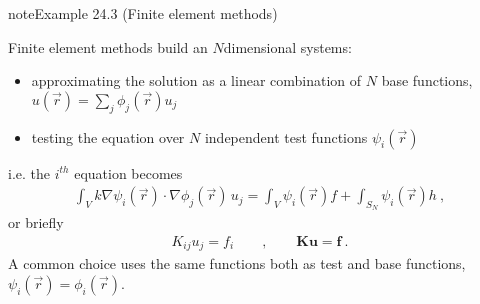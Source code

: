 \documentclass[letterpaper,10pt,english]{jupyterBook}
\begin{document}
\begin{sphinxadmonition}{note}{Example 24.3 (Finite element methods)}



\sphinxAtStartPar
Finite element methods build an \(N\)\sphinxhyphen{}dimensional systems:
\begin{itemize}
\item {} 
\sphinxAtStartPar
approximating the solution as a linear combination of \(N\) base functions, \(u(\vec{r}) = \sum_j \phi_j(\vec{r}) u_j\)

\item {} 
\sphinxAtStartPar
testing the equation over \(N\) independent test functions \(\psi_i(\vec{r})\)

\end{itemize}

\sphinxAtStartPar
i.e. the \(i^{th}\) equation becomes
\begin{equation*}
\begin{split}\int_{V} k \nabla \psi_i(\vec{r}) \cdot \nabla \phi_j(\vec{r}) \, u_j = \int_{V} \psi_i(\vec{r}) f + \int_{S_N} \psi_i(\vec{r}) h \ ,\end{split}
\end{equation*}
\sphinxAtStartPar
or briefly
\begin{equation*}
\begin{split}K_{ij} u_j = f_i \qquad , \qquad \mathbf{K} \mathbf{u} = \mathbf{f} \ .\end{split}
\end{equation*}
\sphinxAtStartPar
A common choice uses the same functions both as test and base functions, \(\psi_i(\vec{r}) = \phi_i(\vec{r})\).
\end{sphinxadmonition}
\end{document}
